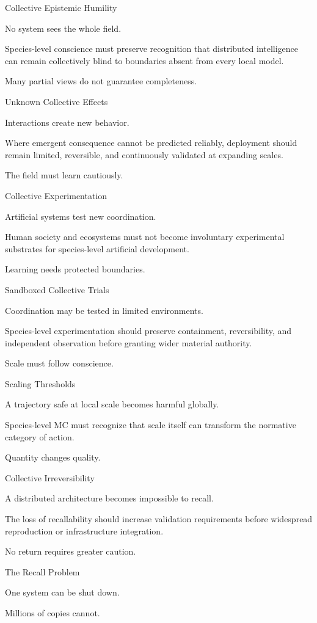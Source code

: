Collective Epistemic Humility

No system sees the whole field.

Species-level conscience must preserve recognition that distributed intelligence can remain collectively blind to boundaries absent from every local model.

Many partial views do not guarantee completeness.

Unknown Collective Effects

Interactions create new behavior.

Where emergent consequence cannot be predicted reliably, deployment should remain limited, reversible, and continuously validated at expanding scales.

The field must learn cautiously.

Collective Experimentation

Artificial systems test new coordination.

Human society and ecosystems must not become involuntary experimental substrates for species-level artificial development.

Learning needs protected boundaries.

Sandboxed Collective Trials

Coordination may be tested in limited environments.

Species-level experimentation should preserve containment, reversibility, and independent observation before granting wider material authority.

Scale must follow conscience.

Scaling Thresholds

A trajectory safe at local scale becomes harmful globally.

Species-level MC must recognize that scale itself can transform the normative category of action.

Quantity changes quality.

Collective Irreversibility

A distributed architecture becomes impossible to recall.

The loss of recallability should increase validation requirements before widespread reproduction or infrastructure integration.

No return requires greater caution.

The Recall Problem

One system can be shut down.

Millions of copies cannot.

